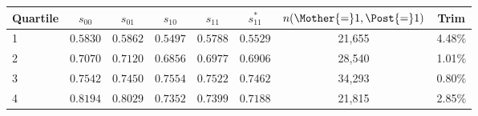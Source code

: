 \begin{tabular}{lccccccc}
\toprule
Quartile & $s_{00}$ & $s_{01}$ & $s_{10}$ & $s_{11}$ & $s^*_{11}$ & $n(\Mother{=}1,\Post{=}1)$ & Trim \\
\midrule
1 & $0.5830$ & $0.5862$ & $0.5497$ & $0.5788$ & $0.5529$ & 21{,}655 & 4.48\% \\
2 & $0.7070$ & $0.7120$ & $0.6856$ & $0.6977$ & $0.6906$ & 28{,}540 & 1.01\% \\
3 & $0.7542$ & $0.7450$ & $0.7554$ & $0.7522$ & $0.7462$ & 34{,}293 & 0.80\% \\
4 & $0.8194$ & $0.8029$ & $0.7352$ & $0.7399$ & $0.7188$ & 21{,}815 & 2.85\% \\
\bottomrule
\end{tabular}
